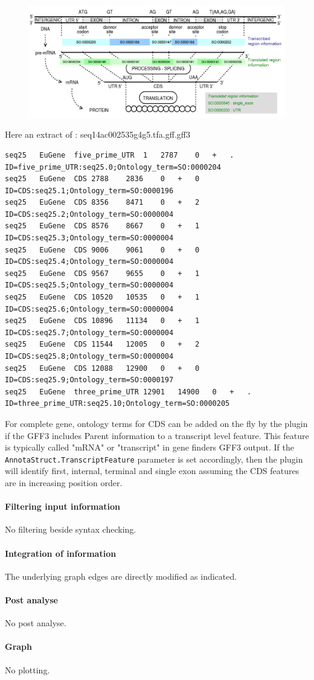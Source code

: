 \begin{figure}[h]
\includegraphics[width=17cm]{SO.png} 
\end{figure}
Here an extract of : seq14ac002535g4g5.tfa.gff.gff3
\begin{Verbatim}[fontsize=\tiny]
seq25	EuGene	five_prime_UTR	1	2787	0	+	.	ID=five_prime_UTR:seq25.0;Ontology_term=SO:0000204
seq25	EuGene	CDS	2788	2836	0	+	0	ID=CDS:seq25.1;Ontology_term=SO:0000196
seq25	EuGene	CDS	8356	8471	0	+	2	ID=CDS:seq25.2;Ontology_term=SO:0000004
seq25	EuGene	CDS	8576	8667	0	+	1	ID=CDS:seq25.3;Ontology_term=SO:0000004
seq25	EuGene	CDS	9006	9061	0	+	0	ID=CDS:seq25.4;Ontology_term=SO:0000004
seq25	EuGene	CDS	9567	9655	0	+	1	ID=CDS:seq25.5;Ontology_term=SO:0000004
seq25	EuGene	CDS	10520	10535	0	+	1	ID=CDS:seq25.6;Ontology_term=SO:0000004
seq25	EuGene	CDS	10896	11134	0	+	1	ID=CDS:seq25.7;Ontology_term=SO:0000004
seq25	EuGene	CDS	11544	12005	0	+	2	ID=CDS:seq25.8;Ontology_term=SO:0000004
seq25	EuGene	CDS	12088	12900	0	+	0	ID=CDS:seq25.9;Ontology_term=SO:0000197
seq25	EuGene	three_prime_UTR	12901	14900	0	+	.	ID=three_prime_UTR:seq25.10;Ontology_term=SO:0000205
\end{Verbatim}

For complete gene, ontology terms for CDS can be added on the fly by the plugin if the GFF3 includes Parent information to a transcript level feature. This feature is typically called "mRNA" or "transcript" in gene finders GFF3 output.
If the \texttt{AnnotaStruct.TranscriptFeature} parameter is set accordingly, then the plugin will identify first, internal, terminal and single exon assuming the CDS features are in increasing position order.

\paragraph{Filtering input information}

No filtering beside syntax checking.

\paragraph{Integration of information}

The underlying graph edges are directly modified as indicated. 

\paragraph{Post analyse}

No post analyse.

\paragraph{Graph}

No plotting.




